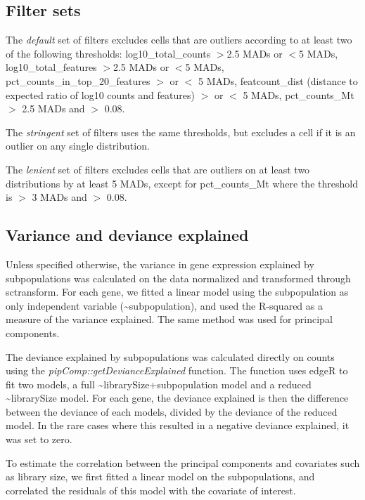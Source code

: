 \documentclass{bmcart}
\begin{document}
\subsection*{Filter sets}
The \textit{default} set of filters excludes cells that are outliers according to at least two of the following thresholds: log10_total_counts $>$2.5 MADs or $<$5 MADs, log10_total_features $>$2.5 MADs or $<$5 MADs, pct_counts_in_top_20_features $>$ or $<$ 5 MADs, featcount_dist (distance to expected ratio of log10 counts and features) $>$ or $<$ 5 MADs, pct_counts_Mt $>$ 2.5 MADs and $>$ 0.08.

The \textit{stringent} set of filters uses the same thresholds, but excludes a cell if it is an outlier on any single distribution. 

The \textit{lenient} set of filters excludes cells that are outliers on at least two distributions by at least 5 MADs, except for pct_counts_Mt where the threshold is $>$ 3 MADs and $>$ 0.08.


\subsection*{Variance and deviance explained}

Unless specified otherwise, the variance in gene expression explained by subpopulations was calculated on the data normalized and transformed through sctransform. For each gene, we fitted a linear model using the subpopulation as only independent variable (\textasciitilde subpopulation), and used the R-squared as a measure of the variance explained. The same method was used for principal components.

The deviance explained by subpopulations was calculated directly on counts using the \textit{pipComp::getDevianceExplained} function. The function uses edgeR to fit two models, a full \textasciitilde librarySize+subpopulation model and a reduced \textasciitilde librarySize model. For each gene, the deviance explained is then the difference between the deviance of each models, divided by the deviance of the reduced model. In the rare cases where this resulted in a negative deviance explained, it was set to zero.

To estimate the correlation between the principal components and covariates such as library size, we first fitted a linear model on the subpopulations, and correlated the residuals of this model with the covariate of interest.


\end{document}
